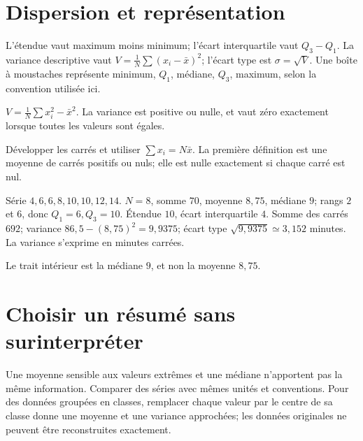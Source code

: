 \section{Dispersion et représentation}
\begin{definition}L’étendue vaut maximum moins minimum; l’écart interquartile vaut $Q_3-Q_1$. La variance descriptive vaut $V=\frac1N\sum(x_i-\bar x)^2$; l’écart type est $\sigma=\sqrt V$. Une boîte à moustaches représente minimum, $Q_1$, médiane, $Q_3$, maximum, selon la convention utilisée ici.\end{definition}
\begin{propriete}$V=\frac1N\sum x_i^2-\bar x^2$. La variance est positive ou nulle, et vaut zéro exactement lorsque toutes les valeurs sont égales.\end{propriete}
\begin{demonstration}Développer les carrés et utiliser $\sum x_i=N\bar x$. La première définition est une moyenne de carrés positifs ou nuls; elle est nulle exactement si chaque carré est nul.\end{demonstration}
\begin{exemple}
Série $4,6,6,8,10,10,12,14$. $N=8$, somme $70$, moyenne $8{,}75$, médiane $9$; rangs $2$ et $6$, donc $Q_1=6,Q_3=10$. Étendue $10$, écart interquartile $4$. Somme des carrés $692$; variance $86{,}5-(8{,}75)^2=9{,}9375$; écart type $\sqrt{9{,}9375}\simeq3{,}152$ minutes. La variance s’exprime en minutes carrées.
\end{exemple}
\begin{visualisation}
\begin{center}\end{center}
Le trait intérieur est la médiane $9$, et non la moyenne $8{,}75$.
\end{visualisation}
\section{Choisir un résumé sans surinterpréter}
Une moyenne sensible aux valeurs extrêmes et une médiane n’apportent pas la même information. Comparer des séries avec mêmes unités et conventions. Pour des données groupées en classes, remplacer chaque valeur par le centre de sa classe donne une moyenne et une variance approchées; les données originales ne peuvent être reconstruites exactement.

